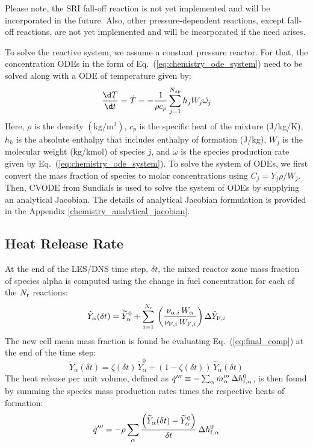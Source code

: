 Please note, the SRI fall-off reaction is not yet implemented and will be incorporated in the future. Also, other pressure-dependent reactions, except fall-off reactions, are not yet implemented and will be incorporated if the need arises.

To solve the reactive system, we assume a constant pressure reactor. For that, the concentration ODEs in the form of Eq.~(\ref{eq:chemistry_ode_system}) need to be solved along with a ODE of temperature given by:
\begin{equation}\label{eq:TemperatureDerivative}
\frac{\d T}{\d t} = \dot{T} = -\frac{1}{\rho c_p} \sum_{j=1}^{N_{sp}}h_j W_j \dot{\omega_j} 
\end{equation} 
Here,  $\rho$  is the density $\mathrm{(kg/m^3)}$, $c_p$ is the specific heat of the mixture (J/kg/K), $h_k$ is the absolute enthalpy that includes enthalpy of formation (J/kg), $W_j$ is the molecular weight (kg/kmol) of species $j$, and $\dot{\omega}$ is the species production rate given by Eq.~(\ref{eq:chemistry_ode_system}).
To solve the system of ODEs, we first convert the mass fraction of species to molar concentrations using $C_j=Y_j\rho/W_j$. Then, CVODE from Sundials is used to solve the system of ODEs by supplying an analytical Jacobian. The details of analytical Jacobian formulation is provided in the Appendix \ref{chemistry_analytical_jacobian}.


\subsection{Heat Release Rate}
\label{sec:hrr}

At the end of the LES/DNS time step, $\delta t$, the mixed reactor zone mass fraction of species alpha is computed using the change in fuel concentration for each of the $N_{\rm r}$ reactions:
\begin{equation}\label{eq:change_alpha}
\hat{Y}_\alpha(\delta t) = \widetilde{Y}_\alpha^0 + \sum_{i=1}^{N_{\rm r}} \,\left(\frac{\nu_{\alpha,i} \,W_{\alpha}}{\nu_{{\rm F},i} \,W_{{\rm F},i}}\right)\Delta \hat{Y}_{{\rm F},i}
\end{equation}
The new cell mean mass fraction is found be evaluating Eq.~(\ref{eq:final_comp}) at the end of the time step:
\begin{equation}
\label{eq:final_comp2}
\widetilde{Y}_{\alpha}(\delta t)= \zeta(\delta t) \, \widetilde{Y}_{\alpha}^0 + (1-\zeta(\delta t)) \, \hat{Y}_{\alpha}(\delta t)
\end{equation}
The heat release per unit volume, defined as $\dot{q}''' \equiv - \sum_\alpha \dot{m}_\alpha''' \, \Delta h_{{\rm f},\alpha}^0$, is then found by summing the species mass production rates times the respective heats of formation:
\begin{equation}\label{eq:vol_heat_gen}
\dot{q}''' = - \rho  \sum_{\alpha} \frac{ \left( \widetilde{Y}_{\alpha}(\delta t)-\widetilde{Y}_{\alpha}^0 \right) }{\delta t} \, \Delta h_{{\rm f},\alpha}^0
\end{equation}





